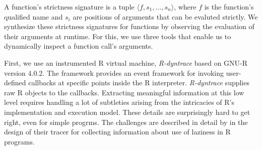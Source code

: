 \documentclass[screen,acmsmall]{acmart}
\begin{document}
A function's strictness signature is a tuple $\langle f, s_1, ..., s_n
\rangle$, where $f$ is the function's qualified name and $s_i$ are positions of arguments that can be
evaluted strictly. We synthesize these strictness signatures for functions by
observing the evaluation of their arguments at runtime. For this, we use three
tools that enable us to dynamically inspect a function call's arguments.


First,
we use an instrumented R virtual machine, \emph{R-dyntrace} \citet{oopsla19b}
based on GNU-R version 4.0.2. The framework provides an event framework for
invoking user-defined callbacks at specific points inside the R interpreter.
\emph{R-dyntrace} supplies raw R objects to the callbacks. Extracting meaningful
information at this low level requires handling a lot of subtleties arising from
the intricacies of R's implementation and execution model. These details are
surprisingly hard to get right, even for simple progrms. The challenges are
described in detail by \cite{oopsla19b} in the design of their tracer for
collecting information about use of laziness in R programs.

\end{document}
